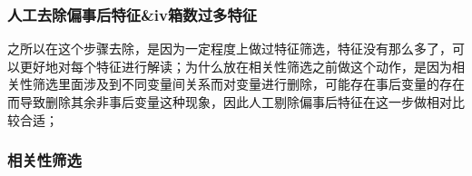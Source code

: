 \documentclass[11pt]{article}
\begin{document}
    \subsubsection{人工去除偏事后特征\&iv箱数过多特征}\label{ux4ebaux5de5ux53bbux9664ux504fux4e8bux540eux7279ux5f81ivux7bb1ux6570ux8fc7ux591aux7279ux5f81}

之所以在这个步骤去除，是因为一定程度上做过特征筛选，特征没有那么多了，可以更好地对每个特征进行解读；为什么放在相关性筛选之前做这个动作，是因为相关性筛选里面涉及到不同变量间关系而对变量进行删除，可能存在事后变量的存在而导致删除其余非事后变量这种现象，因此人工剔除偏事后特征在这一步做相对比较合适；

    \subsubsection{相关性筛选}\label{ux76f8ux5173ux6027ux7b5bux9009}
\end{document}
